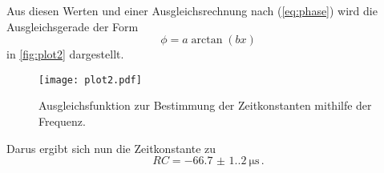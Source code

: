 Aus diesen Werten und einer Ausgleichsrechnung nach (\ref{eq:phase}) wird die Ausgleichsgerade der Form
\begin{equation*}
  \phi=a \arctan (b x)
\end{equation*}
in \autoref{fig:plot2} dargestellt.
\begin{figure}[H]
  \centering
  \texttt{[image: plot2.pdf]}
  \caption{Ausgleichsfunktion zur Bestimmung der Zeitkonstanten mithilfe der Frequenz.}
  \label{fig:plot2}
\end{figure}
Darus ergibt sich nun die Zeitkonstante zu
\begin{equation*}
  RC = \qty{-66.7(1.2)}{\micro\second} \, .
\end{equation*}